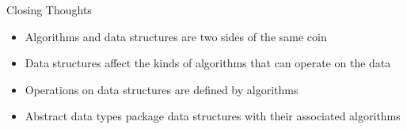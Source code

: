 \documentclass{beamer}
\begin{document}
\begin{frame}[fragile]{Closing Thoughts}




\begin{itemize}
\item Algorithms and data structures are two sides of the same coin
\item Data structures affect the kinds of algorithms that can operate on the data
\item Operations on data structures are defined by algorithms
\item Abstract data types package data structures with their associated algorithms
\end{itemize}

\end{frame}







\end{document}
